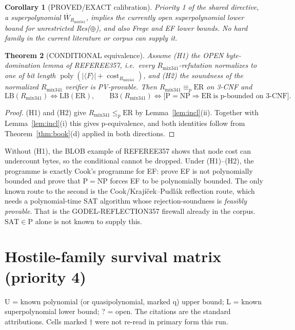 \documentclass[11pt]{article}
\newtheorem{theorem}{Theorem}
\newtheorem{corollary}[theorem]{Corollary}
\theoremstyle{definition}
\newcommand{\Wb}{\overline W}
\newcommand{\Rm}{R_{\mathrm{mix341}}}
\newcommand{\poly}{\operatorname{poly}}
\newcommand{\cost}{\operatorname{cost}}
\begin{document}
\begin{corollary}[PROVED/EXACT calibration]
Priority 1 of the shared directive, a superpolynomial $\Wb_{\Rm}$, implies
the currently open superpolynomial lower bound for unrestricted Res($\oplus$),
and also Frege and EF lower bounds. No hard family in the current
literature or corpus can supply it.
\end{corollary}

\begin{theorem}[CONDITIONAL equivalence]\label{thm:eq}
Assume (H1) the OPEN byte-domination lemma of REFEREE357, i.e.\ every
$\Rm$-refutation normalizes to one of bit length
$\poly(|\langle F\rangle|+\cost_{\Rm})$, and (H2) the soundness of the
normalized $\Rm$ verifier is PV-provable. Then $\Rm\equiv_p\mathrm{ER}$ on
3-CNF and
\[
 \mathrm{LB}(\Rm)\iff\mathrm{LB}(\mathrm{ER}),\qquad
 \mathrm B3(\Rm)\iff\bigl[\mathrm P=\mathrm{NP}\Rightarrow\mathrm{ER}\ \text{is p-bounded on 3-CNF}\bigr].
\]
\end{theorem}
\begin{proof}
(H1) and (H2) give $\Rm\le_p\mathrm{ER}$ by Lemma~\ref{lem:incl}(ii). Together
with Lemma~\ref{lem:incl}(i) this gives p-equivalence, and both identities
follow from Theorem~\ref{thm:book}(d) applied in both directions.
\end{proof}
Without (H1), the BLOB example of REFEREE357 shows that node cost can
undercount bytes, so the conditional cannot be dropped. Under (H1)--(H2), the
programme is exactly Cook's programme for EF: prove EF is not polynomially
bounded and prove that $\mathrm P=\mathrm{NP}$ forces EF to be polynomially
bounded. The only known route to the second is the Cook/Krajíček--Pudlák
reflection route, which needs a polynomial-time SAT algorithm whose
rejection-soundness is \emph{feasibly provable}. That is the
GODEL-REFLECTION357 firewall already in the corpus. $\mathrm{SAT}\in\mathrm P$
alone is not known to supply this.

\section{Hostile-family survival matrix (priority 4)}
U = known polynomial (or quasipolynomial, marked q) upper bound; L = known
superpolynomial lower bound; ? = open. The citations are the standard
attributions. Cells marked $\dagger$ were not re-read in primary form this run.
\end{document}
